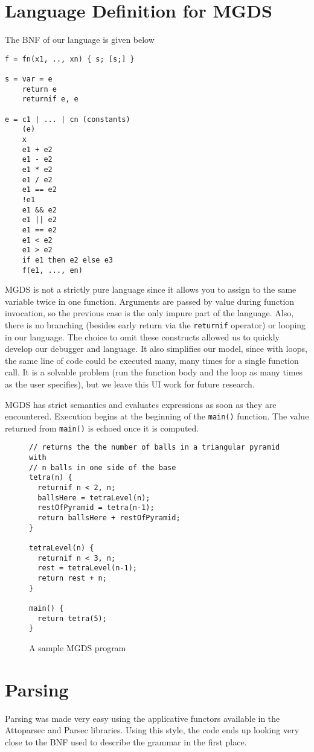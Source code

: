 \documentclass[letterpaper, 10pt]{article}
\newcommand{\ttt}{\texttt}
\begin{document}
\section{Language Definition for MGDS}
The BNF of our language is given below
\begin{verbatim}
f = fn(x1, .., xn) { s; [s;] }

s = var = e
    return e
    returnif e, e

e = c1 | ... | cn (constants)
    (e)
    x
    e1 + e2
    e1 - e2
    e1 * e2
    e1 / e2
    e1 == e2
    !e1
    e1 && e2
    e1 || e2
    e1 == e2
    e1 < e2
    e1 > e2
    if e1 then e2 else e3
    f(e1, ..., en)
\end{verbatim}
MGDS is not a strictly pure language since it allows you to assign to the
same variable twice in one function. Arguments are passed by value during
function invocation, so the previous case is the only impure part of the
language. Also, there is no branching (besides early return via the
\ttt{returnif} operator) or looping in our language. The choice to omit
these constructs allowed us to quickly develop our debugger and
language. It also simplifies our model, since with loops, the same line of
code could be executed many, many times for a single function call. It is
a solvable problem (run the function body and the loop as many times as
the user specifies), but we leave this UI work for future research.

MGDS has strict semantics and evaluates expressions as soon as they are
encountered. Execution begins at the beginning of the \ttt{main()}
function. The value returned from \ttt{main()} is echoed once it is
computed. 


\begin{figure}
\centering
\begin{verbatim}
// returns the the number of balls in a triangular pyramid with
// n balls in one side of the base
tetra(n) {
  returnif n < 2, n;
  ballsHere = tetraLevel(n);
  restOfPyramid = tetra(n-1);
  return ballsHere + restOfPyramid;
}

tetraLevel(n) {
  returnif n < 3, n;
  rest = tetraLevel(n-1);
  return rest + n;
}

main() {
  return tetra(5);
}
\end{verbatim}
\caption{A sample MGDS program}
\end{figure}

\section{Parsing}
Parsing was made very easy using the applicative functors available in the
Attoparsec and Parsec libraries. Using this style, the code ends up
looking very close to the BNF used to describe the grammar in the
first place.
\end{document}
